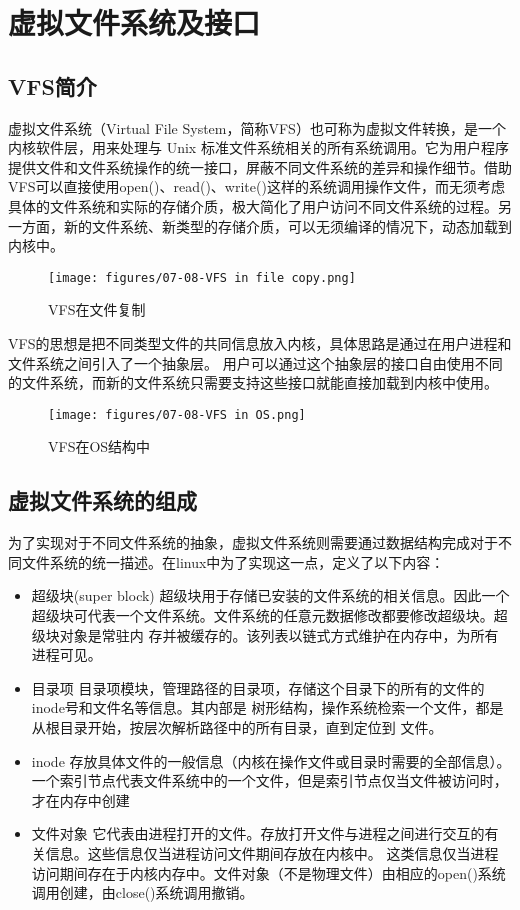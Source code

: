 \section{虚拟文件系统及接口}

\subsection{VFS简介}
虚拟文件系统（Virtual File System，简称VFS）也可称为虚拟文件转换，是一个内核软件层，用来处理与 Unix 标准文件系统相关的所有系统调用。它为用户程序提供文件和文件系统操作的统一接口，屏蔽不同文件系统的差异和操作细节。借助VFS可以直接使用open()、read()、write()这样的系统调用操作文件，而无须考虑具体的文件系统和实际的存储介质，极大简化了用户访问不同文件系统的过程。另一方面，新的文件系统、新类型的存储介质，可以无须编译的情况下，动态加载到内核中。

\begin{figure}[ht]
	\centering
	\texttt{[image: figures/07-08-VFS in file copy.png]}
	\caption{VFS在文件复制}
	\label{fig:VFS in File Copy}
\end{figure}

VFS的思想是把不同类型文件的共同信息放入内核，具体思路是通过在用户进程和文件系统之间引入了一个抽象层。
用户可以通过这个抽象层的接口自由使用不同的文件系统，而新的文件系统只需要支持这些接口就能直接加载到内核中使用。

\begin{figure}[ht]
	\centering
	\texttt{[image: figures/07-08-VFS in OS.png]}
	\caption{VFS在OS结构中}
	\label{fig:VFS in OS}
\end{figure}

\subsection{虚拟文件系统的组成}

为了实现对于不同文件系统的抽象，虚拟文件系统则需要通过数据结构完成对于不同文件系统的统一描述。在linux中为了实现这一点，定义了以下内容：

\begin{itemize}
	\item {超级块(super block)}
	超级块用于存储已安装的文件系统的相关信息。因此一个超级块可代表一个文件系统。文件系统的任意元数据修改都要修改超级块。超级块对象是常驻内
	存并被缓存的。该列表以链式方式维护在内存中，为所有进程可见。
	\item {目录项}
	目录项模块，管理路径的目录项，存储这个目录下的所有的文件的inode号和文件名等信息。其内部是
	树形结构，操作系统检索一个文件，都是从根目录开始，按层次解析路径中的所有目录，直到定位到
	文件。
	\item {inode}
	存放具体文件的一般信息（内核在操作文件或目录时需要的全部信息）。一个索引节点代表文件系统中的一个文件，但是索引节点仅当文件被访问时，才在内存中创建
	\item {文件对象}
	它代表由进程打开的文件。存放打开文件与进程之间进行交互的有关信息。这些信息仅当进程访问文件期间存放在内核中。
	这类信息仅当进程访问期间存在于内核内存中。文件对象（不是物理文件）由相应的open()系统调用创建，由close()系统调用撤销。
\end{itemize}

